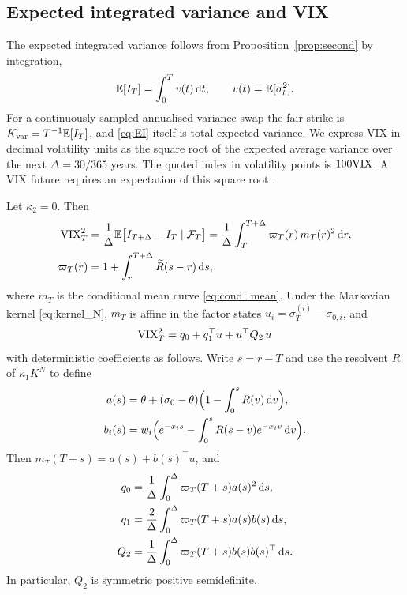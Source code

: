 \subsection{Expected integrated variance and VIX}

The expected integrated variance follows from Proposition~\ref{prop:second} by integration,
\begin{equation}\label{eq:EI}
\E[I_T]=\int_0^T v(t)\,\D t,\qquad v(t)=\E[\sigma_t^2] .
\end{equation}
For a continuously sampled annualised variance swap the fair strike is $K_{\rm var}=T^{-1}\mathbb{E}[I_T]$, and \eqref{eq:EI} itself is total expected variance. We express VIX in decimal volatility units as the square root of the expected average variance over the next $\Delta=30/365$ years. The quoted index in volatility points is $100\mathrm{VIX}$. A VIX future requires an expectation of this square root \citep{Sepp2008}.

\begin{proposition}[VIX]\label{prop:vix}
Let $\kappa_2=0$. Then
\begin{equation}\label{eq:vix}
\begin{split}
\VIX_T^2&=\frac1\Delta\E\big[I_{T+\Delta}-I_T\mid\F_T\big]=\frac1\Delta\int_T^{T+\Delta}\varpi_T(r)\,m_T(r)^2\,\D r,\\
\varpi_T(r)&=1+\int_r^{T+\Delta}\widetilde R(s-r)\,\D s ,
\end{split}
\end{equation}
where $m_T$ is the conditional mean curve \eqref{eq:cond_mean}. Under the Markovian kernel \eqref{eq:kernel_N}, $m_T$ is affine in the factor states $u_i=\sigma^{(i)}_T-\sigma_{0,i}$, and
\begin{equation}\label{eq:vix_quadratic}
\VIX_T^2=q_0+q_1^\top u+u^\top Q_2\,u
\end{equation}
with deterministic coefficients as follows. Write $s=r-T$ and use the resolvent $R$ of $\kappa_1K^N$ to define
\begin{align*}
a(s)&=\theta+(\sigma_0-\theta)\Big(1-\int_0^sR(v)\,\mathrm{d} v\Big),\\
b_i(s)&=w_i\Big(e^{-x_i s}-\int_0^sR(s-v)e^{-x_i v}\,\mathrm{d} v\Big).
\end{align*}
Then $m_T(T+s)=a(s)+b(s)^\top u$, and
\begin{align*}
q_0&=\frac1\Delta\int_0^\Delta\varpi_T(T+s)a(s)^2\,\mathrm{d} s,\\
q_1&=\frac2\Delta\int_0^\Delta\varpi_T(T+s)a(s)b(s)\,\mathrm{d} s,\\
Q_2&=\frac1\Delta\int_0^\Delta\varpi_T(T+s)b(s)b(s)^\top\,\mathrm{d} s.
\end{align*}
In particular, $Q_2$ is symmetric positive semidefinite.
\end{proposition}

